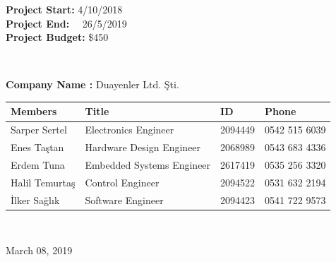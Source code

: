 \documentclass[a4paper,12pt]{article}
\begin{document}
\begin{titlepage}
\begin{minipage}[r]{0.35\textwidth}
\textbf{Project Start:} 4/10/2018\\

\textbf{Project End:} \ \  26/5/2019\\

\textbf{Project Budget:} \$450


\end{minipage}\\[1cm]

\begin{minipage}{\textwidth}

\begin{flushleft}

\large{\textbf{Company Name :}}	Duayenler Ltd. Şti.\\

\begin{table}[H]

\begin{tabular}{l l l l}

\hline

\textbf{Members} & \textbf{Title}            & \textbf{ID} & \textbf{Phone} \\ \hline

Sarper Sertel    & Electronics Engineer      & 2094449     & 0542 515 6039  \\ 

Enes Taştan     & Hardware Design Engineer  & 2068989     & 0543 683 4336  \\ 

Erdem Tuna       & Embedded Systems Engineer & 2617419     & 0535 256 3320  \\ 

Halil Temurtaş  & Control Engineer          & 2094522     & 0531 632 2194  \\

İlker Sağlık  & Software Engineer         & 2094423     & 0541 722 9573  \\ \hline



\end{tabular}

\end{table}

\end{flushleft}

\end{minipage}\\[1cm]


\begin{flushbottom}

{\large March 08, 2019} %

\end{flushbottom}


\end{titlepage}
\end{document}
